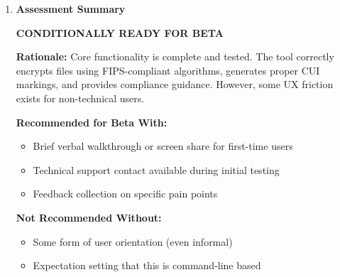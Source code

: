 \documentclass[11pt,letterpaper]{article}
\newcommand{\dmsection}[1]{\item \textbf{#1}\par}
\begin{document}
\begin{enumerate}
\begin{enumerate}
    \item \textbf{Password Entry UX} -- Console password prompts show no characters while typing (security feature). Users may think nothing is happening.

    \item \textbf{Recipient File Path Handling} -- Recipients need to navigate to where they saved the .Locked files. No drag-and-drop support.
\end{enumerate}

\textbf{Medium Priority:}
\begin{enumerate}
    \item \textbf{No Quick-Start Guide} -- Users would benefit from a 1-page PDF with screenshots.

    \item \textbf{``What is PowerShell?''} -- Some users have never seen a PowerShell window.

    \item \textbf{Weak Password Acceptance} -- Tool accepts ``12345678'' (meets 8-char minimum but is trivially guessable).
\end{enumerate}

\dmsection{Assessment Summary}

\begin{center}
\Large\textbf{CONDITIONALLY READY FOR BETA}
\end{center}

\textbf{Rationale:} Core functionality is complete and tested. The tool correctly encrypts files using FIPS-compliant algorithms, generates proper CUI markings, and provides compliance guidance. However, some UX friction exists for non-technical users.

\textbf{Recommended for Beta With:}
\begin{itemize}
    \item Brief verbal walkthrough or screen share for first-time users
    \item Technical support contact available during initial testing
    \item Feedback collection on specific pain points
\end{itemize}

\textbf{Not Recommended Without:}
\begin{itemize}
    \item Some form of user orientation (even informal)
    \item Expectation setting that this is command-line based
\end{itemize}


\end{enumerate}
\end{document}
